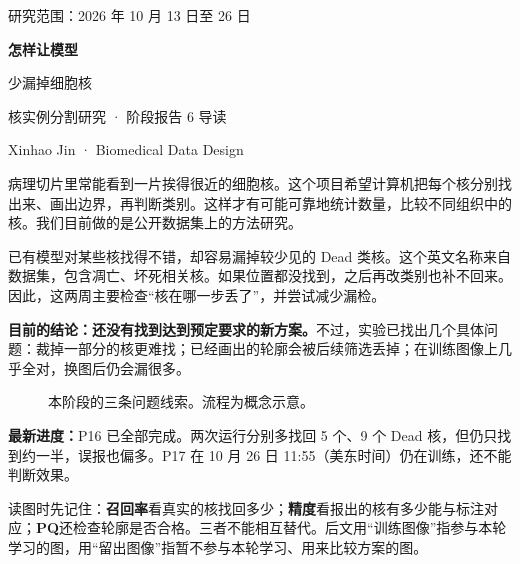 \documentclass[UTF8,zihao=-4,fontset=windows]{ctexart}
\begin{document}
\begin{center}
{\small\color{teal}研究范围：2026 年 10 月 13 日至 26 日}\par\vspace{9mm}
{\huge\bfseries 怎样让模型\par 少漏掉细胞核}\par\vspace{5mm}
{\Large 核实例分割研究 · 阶段报告 6 导读}\par\vspace{4mm}
Xinhao Jin · Biomedical Data Design
\end{center}
\vspace{4mm}
病理切片里常能看到一片挨得很近的细胞核。这个项目希望计算机把每个核分别找出来、画出边界，再判断类别。这样才有可能可靠地统计数量，比较不同组织中的核。我们目前做的是公开数据集上的方法研究。

已有模型对某些核找得不错，却容易漏掉较少见的 Dead 类核。这个英文名称来自数据集，包含凋亡、坏死相关核。如果位置都没找到，之后再改类别也补不回来。因此，这两周主要检查“核在哪一步丢了”，并尝试减少漏检。

\textbf{目前的结论：还没有找到达到预定要求的新方案。}不过，实验已找出几个具体问题：裁掉一部分的核更难找；已经画出的轮廓会被后续筛选丢掉；在训练图像上几乎全对，换图后仍会漏很多。

\begin{figure}[H]\centering
{}
\caption{本阶段的三条问题线索。流程为概念示意。}
\end{figure}

\noindent\colorbox{pale}{\parbox{.95\linewidth}{\small
\textbf{最新进度：}P16 已全部完成。两次运行分别多找回 5 个、9 个 Dead 核，但仍只找到约一半，误报也偏多。P17 在 10 月 26 日 11:55（美东时间）仍在训练，还不能判断效果。}}

读图时先记住：\textbf{召回率}看真实的核找回多少；\textbf{精度}看报出的核有多少能与标注对应；\textbf{PQ}还检查轮廓是否合格。三者不能相互替代。后文用“训练图像”指参与本轮学习的图，用“留出图像”指暂不参与本轮学习、用来比较方案的图。
\end{document}
